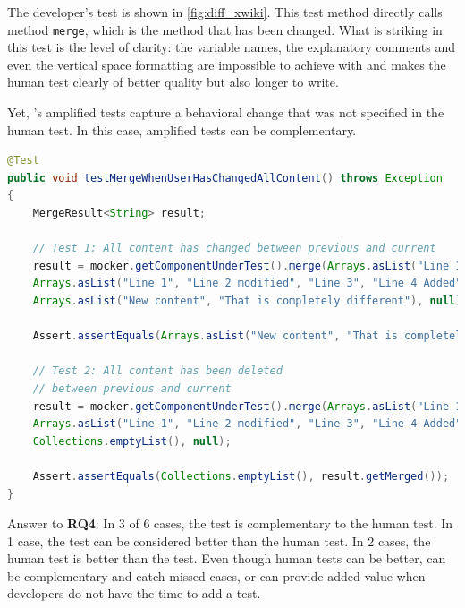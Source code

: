 The developer's test is shown in \autoref{fig:diff_xwiki}.
This test method directly calls method \texttt{merge}, which is the method that has been changed. 
What is striking in this test is the level of clarity: 
the variable names, the explanatory comments and even the vertical space formatting are impossible to achieve with \DCIA and makes the human test clearly of better quality but also longer to write.

Yet, \DCIA's amplified tests capture a behavioral change that was not specified in the human test.
In this case, amplified tests can be complementary.

\begin{lstlisting}[float,language=java,caption=Developer test for \textsc{d3101ae} of XWiki.,label=fig:diff_xwiki]
@Test
public void testMergeWhenUserHasChangedAllContent() throws Exception
{
	MergeResult<String> result;

	// Test 1: All content has changed between previous and current
	result = mocker.getComponentUnderTest().merge(Arrays.asList("Line 1", "Line 2", "Line 3"),
	Arrays.asList("Line 1", "Line 2 modified", "Line 3", "Line 4 Added"),
	Arrays.asList("New content", "That is completely different"), null);

	Assert.assertEquals(Arrays.asList("New content", "That is completely different"), result.getMerged());

	// Test 2: All content has been deleted 
	// between previous and current
	result = mocker.getComponentUnderTest().merge(Arrays.asList("Line 1", "Line 2", "Line 3"),
	Arrays.asList("Line 1", "Line 2 modified", "Line 3", "Line 4 Added"),
	Collections.emptyList(), null);

	Assert.assertEquals(Collections.emptyList(), result.getMerged());
}
\end{lstlisting}


\begin{mdframed}
Answer to \textbf{RQ4}: 
In 3 of 6 cases, the \DCI test is complementary to the human test.
In 1 case, the \DCI test can be considered better than the human test.
In 2 cases, the human test is better than the \DCI test.
Even though human tests can be better, \DCI can be complementary and catch missed cases, or can provide added-value when developers do not have the time to add a test.
\end{mdframed}

